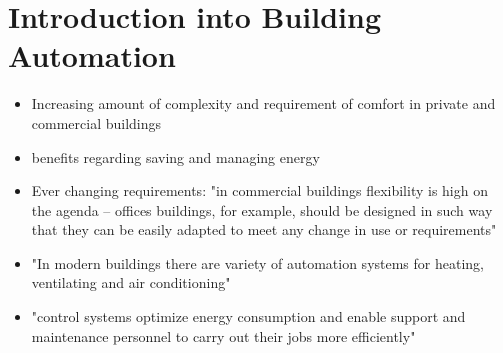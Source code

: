 
\section{Introduction into Building Automation}
	\begin{itemize}
		\item Increasing amount of complexity and requirement of comfort in private and commercial buildings \parencite{Merz2009}

		\item benefits regarding saving and managing energy \parencite{Merz2009}
		\item Ever changing requirements: "in commercial buildings flexibility is high on the agenda -- offices buildings, for example, should be designed in such way that they can be easily adapted to meet any change in use or requirements" \parencite{Merz2009}
		\item "In modern buildings there are variety of automation systems for heating, ventilating and air conditioning" \parencite{Merz2009}
		\item "control systems optimize energy consumption and enable support and maintenance personnel to carry out their jobs more efficiently" \parencite{Merz2009}
		
	\end{itemize}

\section{\knx}
	
